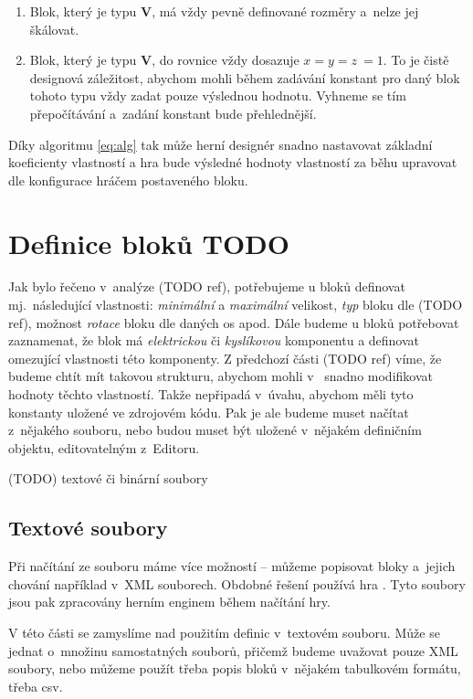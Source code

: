 \begin{enumerate}
	\item Blok, který je typu \textbf{V}, má vždy pevně definované rozměry a~nelze jej škálovat.
	\item Blok, který je typu \textbf{V}, do rovnice vždy dosazuje $ x = y = z~= 1$.
	\subitem To je čistě designová záležitost, abychom mohli během zadávání konstant pro daný blok tohoto typu vždy zadat pouze výslednou hodnotu. Vyhneme se tím přepočítávání a~zadání konstant bude přehlednější.
\end{enumerate}

Díky algoritmu \ref{eq:alg} tak může herní designér snadno nastavovat základní koeficienty vlastností a hra bude výsledné hodnoty vlastností za běhu upravovat dle konfigurace hráčem postaveného bloku.




\section{Definice bloků TODO}

Jak bylo řečeno v~analýze (TODO ref), potřebujeme u bloků definovat mj.~následující vlastnosti: \textit{minimální} a \textit{maximální} velikost, \textit{typ} bloku dle (TODO ref), možnost \textit{rotace} bloku dle daných os apod. Dále budeme u bloků potřebovat zaznamenat, že blok má \textit{elektrickou} či \textit{kyslíkovou} komponentu a definovat omezující vlastnosti této komponenty. Z předchozí části (TODO ref) víme, že budeme chtít mít takovou strukturu, abychom mohli v~\UEu{} snadno modifikovat hodnoty těchto vlastností. Takže nepřipadá v~úvahu, abychom měli tyto konstanty uložené ve zdrojovém kódu. Pak je ale budeme muset načítat z~nějakého souboru, nebo budou muset být uložené v~nějakém definičním objektu, editovatelným z~Editoru.

(TODO) textové či binární soubory

\subsection{Textové soubory}
Při načítání ze souboru máme více možností -- můžeme popisovat bloky a~jejich chování například v~XML souborech. Obdobné řešení používá hra \ME{}. Tyto soubory jsou pak zpracovány herním enginem během načítání hry. 

V této části se zamyslíme nad použitím definic v~textovém souboru. Může se jednat o~množinu samostatných souborů, přičemž budeme uvažovat pouze XML soubory, nebo můžeme použít třeba popis bloků v~nějakém tabulkovém formátu, třeba csv.

